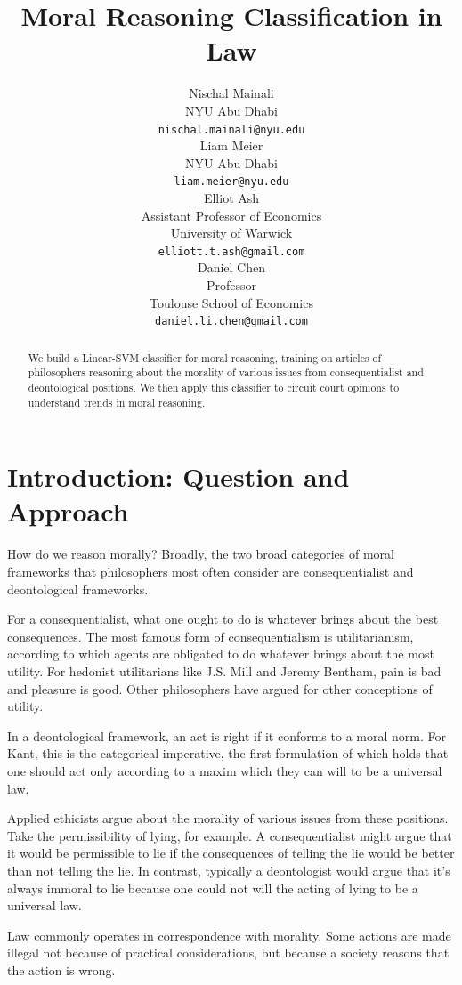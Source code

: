 \documentclass{article}
\title{Moral Reasoning Classification in Law}
\author{
  Nischal Mainali\\
  NYU Abu Dhabi\\
  \texttt{nischal.mainali@nyu.edu} \\
 \And
  Liam Meier\\
  NYU Abu Dhabi \\
  \texttt{liam.meier@nyu.edu} \\
   \AND
  Elliot Ash\\
  Assistant Professor of Economics\\
  University of Warwick\\
  \texttt{elliott.t.ash@gmail.com} \\
   \And
  Daniel Chen\\
  Professor \\
  Toulouse School of Economics\\
  \texttt{daniel.li.chen@gmail.com} \\
}
\begin{document}

\maketitle

\begin{abstract}
We build a Linear-SVM classifier for moral reasoning, training on articles of philosophers reasoning about the morality of various issues from consequentialist and deontological positions. We then apply this classifier to circuit court opinions to understand trends in moral reasoning.

\end{abstract}



\section{Introduction: Question and Approach}
How do we reason morally? Broadly, the two broad categories of moral frameworks that philosophers most often consider  are consequentialist and deontological frameworks.

For a consequentialist, what one ought to do is whatever brings about the best consequences. The most famous form of consequentialism is utilitarianism, according to which agents are obligated to do whatever brings about the most utility. For hedonist utilitarians like J.S. Mill and Jeremy Bentham, pain is bad and pleasure is good. Other philosophers have argued for other conceptions of utility.

In a deontological framework, an act is right if it conforms to a moral norm. For Kant, this is the categorical imperative, the first formulation of which holds that one should act only according to a maxim which they can will to be a universal law.

Applied ethicists argue about the morality of various issues from these positions. Take the permissibility of lying, for example. A consequentialist might argue that it would be permissible to lie if the consequences of telling the lie would be better than not telling the lie. In contrast, typically a deontologist would argue that it's always immoral to lie because one could not will the acting of lying to be a universal law.

Law commonly operates in correspondence with morality. Some actions are made illegal not because of practical considerations, but because a society reasons that the action is wrong.
\end{document}
